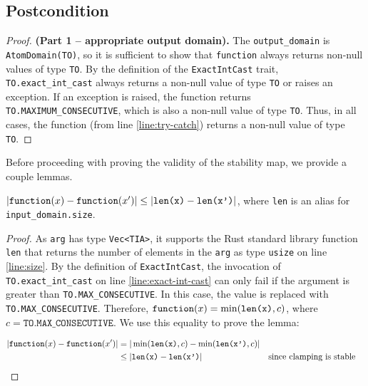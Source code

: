 \documentclass{article}
\begin{document}
\subsection*{Postcondition}
\begin{theorem}
\end{theorem}
\begin{proof} \textbf{(Part 1 -- appropriate output domain).}
    The \texttt{output\_domain} is \texttt{AtomDomain(TO)}, so it is sufficient to show that \texttt{function} always returns non-null values of type \texttt{TO}.
    By the definition of the \texttt{ExactIntCast} trait, \texttt{TO.exact\_int\_cast} always returns a non-null value of type \texttt{TO} or raises an exception.
    If an exception is raised, the function returns \texttt{TO.MAXIMUM\_CONSECUTIVE}, which is also a non-null value of type \texttt{TO}.
    Thus, in all cases, the function (from line \ref{line:try-catch}) returns a non-null value of type \texttt{TO}.
\end{proof}

Before proceeding with proving the validity of the stability map, we provide a couple lemmas.

\begin{lemma}
    \label{dsym-sens}
    $|\texttt{function}(x) - \texttt{function}(x')| \leq |\texttt{len(x)} - \texttt{len(x')}|$,
    where \texttt{len} is an alias for \\ \texttt{input\_domain.size}.
\end{lemma}

\begin{proof}
    As \texttt{arg} has type \texttt{Vec<TIA>}, it supports the Rust standard library function \texttt{len}
    that returns the number of elements in the \texttt{arg} as type \texttt{usize} on line \ref{line:size}.
    By the definition of \texttt{ExactIntCast},
    the invocation of \texttt{TO.exact\_int\_cast} on line \ref{line:exact-int-cast} can only fail if the argument is greater than \texttt{TO.MAX\_CONSECUTIVE}.
    In this case, the value is replaced with \texttt{TO.MAX\_CONSECUTIVE}.
    Therefore, $\texttt{function}(x) = \min(\texttt{len(x)}, c)$, where $c = \texttt{TO.MAX\_CONSECUTIVE}$.
    We use this equality to prove the lemma:

    \begin{align*}
        |\texttt{function}(x) - \texttt{function}(x')| &= |\min(\texttt{len(x)}, c) - \min(\texttt{len(x')}, c)| \\
        &\leq |\texttt{len(x)} - \texttt{len(x')}| &&\text{since clamping is stable} \\
    \end{align*}
\end{proof}
\end{document}
